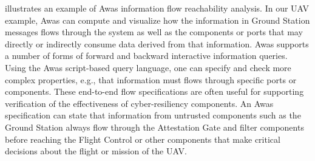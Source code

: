  illustrates an example of Awas information flow reachability analysis.
In our UAV example, Awas can compute and visualize how the information in Ground Station messages flows through the system
as well as the components or ports that may directly or indirectly consume data derived from that information.
Awas supports a number of forms of forward and backward interactive information queries.
Using the Awas script-based query language, one can specify and check more complex properties, e.g.,
that information must flows through specific ports or components.
These end-to-end flow specifications are often useful for supporting verification of the
effectiveness of cyber-resiliency components.   An Awas specification can state that
information from untrusted components such as the Ground Station always flow through the
Attestation Gate and filter components before reaching the Flight Control or other components
that make critical decisions about the flight or mission of the UAV.

